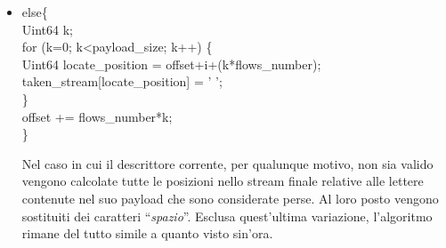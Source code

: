 \begin{itemize}
\begin{notabene}
Non ha senso effettuare paragoni tra descrittori appartenenti a flussi diversi, in quanto non sono in alcun modo correlati.
\end{notabene}
Se il descrittore corrente viene ritenuto valido all'interno del Multiple Description Stream si passa alla decodifica. Viene prelevato il payload e trasferito in una struttura dati in memoria (Memory DataChunk). Il contenitore temporaneo dello stream decodificato viene ridimensionato per contenere (potenzialmente) tutti i payload provenienti da tutti i descrittori. \`E possibile raggiungere la dimensione massima esclusivamente nel caso in cui non vi sia alcun errore di trasmissione. Successivamente si prelevano le singole lettere dalla struttura dati in memoria. Se la i-esima lettera estratta ha un codice ascii diverso da ``\emph{0}'' si passa al calcolo della sua posizione assoluta all'interno dello stream finale (decodificato) e al posizionamento del carattere corrente in tale posizione. Infine viene aggiornato un contatore che tiene conto della massima posizione raggiunta in tale fase. Tale contatore servir\`a successivamente, pertanto il suo significato verr\`a descritto in seguito.

 \item \begin{code}
else\{\\
	Uint64 k;\\
	for (k=0; k<payload\_size; k++) \{\\
		Uint64 locate\_position = offset+i+(k*flows\_number);\\
		taken\_stream[locate\_position] = ' ';\\
	\}\\
	offset += flows\_number*k;\\
\}\\
\end{code}
Nel caso in cui il descrittore corrente, per qualunque motivo, non sia valido vengono calcolate tutte le posizioni nello stream finale relative alle lettere contenute nel suo payload che sono considerate perse. Al loro posto vengono sostituiti dei caratteri ``\emph{spazio}''. Esclusa quest'ultima variazione, l'algoritmo rimane del tutto simile a quanto visto sin'ora.


\end{itemize}
